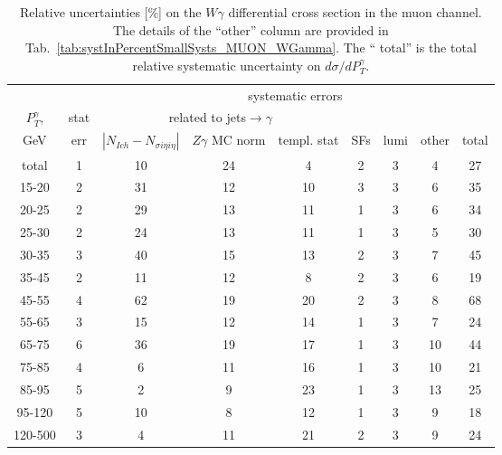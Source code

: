 \begin{table}[h]
  \scriptsize
  \begin{center}
  \caption{Relative uncertainties [\%] on the $W\gamma$ differential cross section in the muon channel. The details of the ``other'' column are provided in Tab.~\ref{tab:systInPercentSmallSysts_MUON_WGamma}. The `` total'' is the total relative systematic uncertainty on $d\sigma/dP_T^{\gamma}$.}
   \begin{tabular}{|c|c|c|c|c|c|c|c|c|}
                   &     & \multicolumn{7}{|c|}{systematic errors}     \\
    $P_T^{\gamma}$,  & stat & \multicolumn{3}{|c|}{related to jets$\rightarrow\gamma$}              &  &  &  & \\
    GeV           & err & $|N_{Ich}-N_{\sigma{i\eta i\eta}}|$ &$Z\gamma$ MC norm         &templ. stat  & SFs & lumi & other & total\\ \hline
    total  & 1 & 10 & 24 & 4 & 2 & 3 & 4 & 27 \\ \hline
    15-20 & 2 & 31 & 12 & 10 & 3 & 3 & 6 & 35 \\ \hline
    20-25 & 2 & 29 & 13 & 11 & 1 & 3 & 6 & 34 \\ \hline
    25-30 & 2 & 24 & 13 & 11 & 1 & 3 & 5 & 30 \\ \hline
    30-35 & 3 & 40 & 15 & 13 & 2 & 3 & 7 & 45 \\ \hline
    35-45 & 2 & 11 & 12 & 8 & 2 & 3 & 6 & 19 \\ \hline
    45-55 & 4 & 62 & 19 & 20 & 2 & 3 & 8 & 68 \\ \hline
    55-65 & 3 & 15 & 12 & 14 & 1 & 3 & 7 & 24 \\ \hline
    65-75 & 6 & 36 & 19 & 17 & 1 & 3 & 10 & 44 \\ \hline
    75-85 & 4 & 6 & 11 & 16 & 1 & 3 & 10 & 21 \\ \hline
    85-95 & 5 & 2 & 9 & 23 & 1 & 3 & 13 & 25 \\ \hline
    95-120 & 5 & 10 & 8 & 12 & 1 & 3 & 9 & 18 \\ \hline
    120-500 & 3 & 4 & 11 & 21 & 2 & 3 & 9 & 24 \\ \hline
  \end{tabular}
  \label{tab:systInPercent_MUON_WGamma}
  \end{center}
\end{table}

